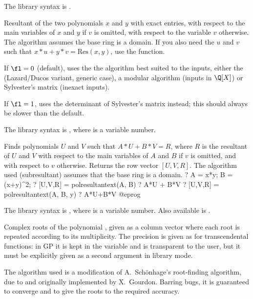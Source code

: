 The library syntax is .

\label{se:polresultant}
Resultant of the two
polynomials $x$ and $y$ with exact entries, with respect to the main
variables of $x$ and $y$ if $v$ is omitted, with respect to the variable $v$
otherwise. The algorithm assumes the base ring is a domain. If you also need
the $u$ and $v$ such that $x*u + y*v = \text{Res}(x,y)$, use the
 function.

If $\fl=0$ (default), uses the the algorithm best suited to the inputs,
either the  (Lazard/Ducos variant, generic case),
a modular algorithm (inputs in $\Q[X]$) or Sylvester's matrix (inexact
inputs).

If $\fl=1$, uses the determinant of Sylvester's matrix instead; this should
always be slower than the default.

The library syntax is , where  is a variable number.

\label{se:polresultantext}
Finds polynomials $U$ and $V$ such that $A*U + B*V = R$, where $R$ is
the resultant of $U$ and $V$ with respect to the main variables of $A$ and
$B$ if $v$ is omitted, and with respect to $v$ otherwise. Returns the row
vector $[U,V,R]$. The algorithm used (subresultant) assumes that the base
ring is a domain.
\bprog
? A = x*y; B = (x+y)^2;
? [U,V,R] = polresultantext(A, B)
? A*U + B*V
? [U,V,R] = polresultantext(A, B, y)
? A*U+B*V
@eprog

The library syntax is , where  is a variable number.
Also available is
.

\label{se:polroots}
Complex roots of the polynomial
, given as a column vector where each root is repeated according to
its multiplicity. The precision is given as for transcendental functions: in
GP it is kept in the variable  and is transparent to the
user, but it must be explicitly given as a second argument in library mode.

The algorithm used is a modification of A.~Sch\"onhage's
root-finding algorithm, due to and originally implemented by X.~Gourdon.
Barring bugs, it is guaranteed to converge and to give the roots to the
required accuracy.

